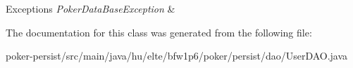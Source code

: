 \begin{DoxyExceptions}{Exceptions}
{\em Poker\+Data\+Base\+Exception} & \\
\hline
\end{DoxyExceptions}


The documentation for this class was generated from the following file\+:\begin{DoxyCompactItemize}
\item 
poker-\/persist/src/main/java/hu/elte/bfw1p6/poker/persist/dao/User\+D\+A\+O.\+java\end{DoxyCompactItemize}
